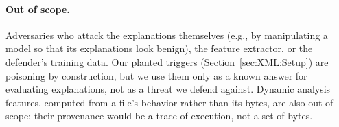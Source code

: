 \paragraph{Out of scope.} Adversaries who attack the explanations themselves (e.g., by manipulating a model so that its
explanations look benign), the feature extractor, or the defender's training data. Our planted triggers
(Section~\ref{sec:XML:Setup}) are poisoning by construction, but we use them only as a known answer for evaluating
explanations, not as a threat we defend against. Dynamic analysis features, computed from a file's behavior rather
than its bytes, are also out of scope: their provenance would be a trace of execution, not a set of bytes.
